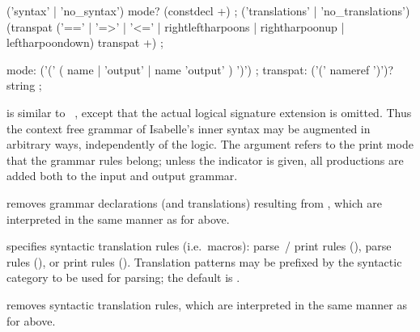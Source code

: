 \begin{isabellebody}
\begin{isamarkuptext}
  \begin{rail}
    ('syntax' | 'no\_syntax') mode? (constdecl +)
    ;
    ('translations' | 'no\_translations') (transpat ('==' | '=>' | '<=' | rightleftharpoons | rightharpoonup | leftharpoondown) transpat +)
    ;

    mode: ('(' ( name | 'output' | name 'output' ) ')')
    ;
    transpat: ('(' nameref ')')? string
    ;
  \end{rail}

  \begin{descr}
  
  \item [\hyperlink{command.syntax}{\mbox{\isa{\isacommand{syntax}}}}~\isa{{\isachardoublequote}{\isacharparenleft}mode{\isacharparenright}\ decls{\isachardoublequote}}] is similar to
  \hyperlink{command.consts}{\mbox{}}~, except that the actual logical
  signature extension is omitted.  Thus the context free grammar of
  Isabelle's inner syntax may be augmented in arbitrary ways,
  independently of the logic.  The  argument refers to the
  print mode that the grammar rules belong; unless the \hyperlink{keyword.output}{\mbox{}} indicator is given, all productions are added both to the
  input and output grammar.
  
  \item [\hyperlink{command.no-syntax}{\mbox{\isa{\isacommand{no{\isacharunderscore}syntax}}}}~\isa{{\isachardoublequote}{\isacharparenleft}mode{\isacharparenright}\ decls{\isachardoublequote}}] removes
  grammar declarations (and translations) resulting from , which are interpreted in the same manner as for \hyperlink{command.syntax}{\mbox{}} above.
  
  \item [\hyperlink{command.translations}{\mbox{\isa{\isacommand{translations}}}}~\isa{rules}] specifies syntactic
  translation rules (i.e.\ macros): parse~/ print rules (\isa{{\isachardoublequote}{\isasymrightleftharpoons}{\isachardoublequote}}),
  parse rules (\isa{{\isachardoublequote}{\isasymrightharpoonup}{\isachardoublequote}}), or print rules (\isa{{\isachardoublequote}{\isasymleftharpoondown}{\isachardoublequote}}).
  Translation patterns may be prefixed by the syntactic category to be
  used for parsing; the default is .
  
  \item [\hyperlink{command.no-translations}{\mbox{\isa{\isacommand{no{\isacharunderscore}translations}}}}~\isa{rules}] removes syntactic
  translation rules, which are interpreted in the same manner as for
  \hyperlink{command.translations}{\mbox{}} above.


\end{descr}
\end{isamarkuptext}
\end{isabellebody}
